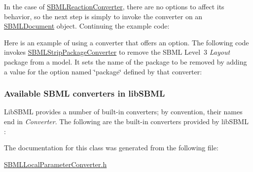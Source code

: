 In the case of \hyperlink{class_s_b_m_l_reaction_converter}{S\+B\+M\+L\+Reaction\+Converter}, there are no options to affect its behavior, so the next step is simply to invoke the converter on an \hyperlink{class_s_b_m_l_document}{S\+B\+M\+L\+Document} object. Continuing the example code\+:

Here is an example of using a converter that offers an option. The following code invokes \hyperlink{class_s_b_m_l_strip_package_converter}{S\+B\+M\+L\+Strip\+Package\+Converter} to remove the S\+B\+ML Level~3 {\itshape Layout} package from a model. It sets the name of the package to be removed by adding a value for the option named {\ttfamily \char`\"{}package\char`\"{}} defined by that converter\+:\hypertarget{classdoc__section__using__sbml__converters_available-converters}{}\subsubsection{Available S\+B\+M\+L converters in lib\+S\+B\+ML}\label{classdoc__section__using__sbml__converters_available-converters}
Lib\+S\+B\+ML provides a number of built-\/in converters; by convention, their names end in {\itshape Converter}. The following are the built-\/in converters provided by lib\+S\+B\+ML \+:

The documentation for this class was generated from the following file\+:\begin{DoxyCompactItemize}
\item 
\hyperlink{_s_b_m_l_local_parameter_converter_8h}{S\+B\+M\+L\+Local\+Parameter\+Converter.\+h}\end{DoxyCompactItemize}
